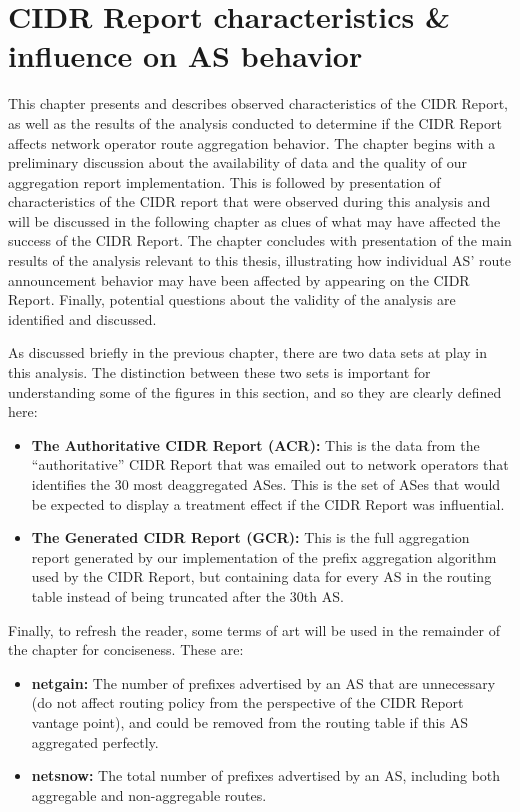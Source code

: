 \chapter{CIDR Report characteristics \& influence on AS behavior}
\label{chap:analysis}

This chapter presents and describes observed characteristics of the CIDR Report,
as well as the results of the analysis conducted to determine if the CIDR Report
affects network operator route aggregation behavior. The chapter begins with
a preliminary discussion about the availability of data and the quality of our
aggregation report implementation. This is followed by presentation of
characteristics of the CIDR report that were observed during this analysis and
will be discussed in the following chapter as clues of what may have affected
the success of the CIDR Report. The chapter concludes with presentation of the
main results of the analysis relevant to this thesis, illustrating how
individual AS' route announcement behavior may have been affected by appearing
on the CIDR Report. Finally, potential questions about the validity of the
analysis are identified and discussed.

As discussed briefly in the previous chapter, there are two data sets at play in
this analysis. The distinction between these two sets is important for
understanding some of the figures in this section, and so they are clearly
defined here:
\begin{itemize}
\item{\textbf{The Authoritative CIDR Report (ACR):} This is the data from the
``authoritative'' CIDR Report that was emailed out to network operators that
identifies the 30 most deaggregated ASes. This is the set of ASes that would be
expected to display a treatment effect if the CIDR Report was influential.}
\item{\textbf{The Generated CIDR Report (GCR):} This is the full aggregation
report generated by our implementation of the prefix aggregation algorithm used
by the CIDR Report, but containing data for every AS in the routing table
instead of being truncated after the 30th AS.}
\end{itemize}

Finally, to refresh the reader, some terms of art will be used in the remainder
of the chapter for conciseness. These are:
\begin{itemize}
\item{\textbf{netgain:} The number of prefixes advertised by an AS that are
unnecessary (do not affect routing policy from the perspective of the CIDR
Report vantage point), and could be removed from the routing table if this AS
aggregated perfectly.}
\item{\textbf{netsnow:} The total number of prefixes advertised by an AS,
including both aggregable and non-aggregable routes.}
\end{itemize}

